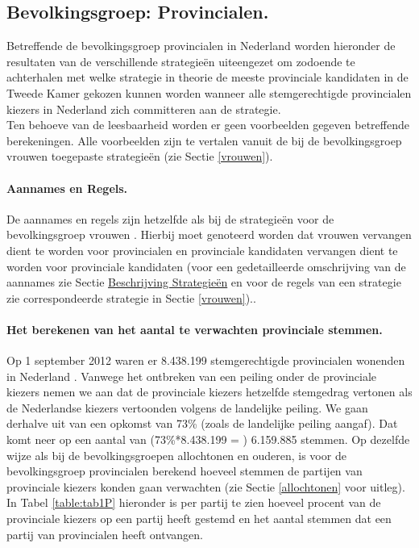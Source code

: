 \subsection{Bevolkingsgroep: Provincialen.} \label{provincialen}
Betreffende de bevolkingsgroep provincialen in Nederland worden hieronder de resultaten van de verschillende strategie\"{e}n uiteengezet om zodoende te achterhalen met welke strategie in theorie de meeste provinciale kandidaten in de Tweede Kamer gekozen kunnen worden wanneer alle stemgerechtigde provincialen kiezers in Nederland zich committeren aan de strategie.\\
\indent Ten behoeve van de leesbaarheid worden er geen voorbeelden gegeven betreffende berekeningen. Alle voorbeelden zijn te vertalen vanuit de bij de bevolkingsgroep vrouwen toegepaste strategie\"{e}n (zie Sectie \ref{vrouwen}). 

\paragraph{Aannames en Regels.}
De aannames en regels zijn hetzelfde als bij de strategie\"{e}n voor de bevolkingsgroep vrouwen . Hierbij moet genoteerd worden dat vrouwen vervangen dient te worden voor provincialen en provinciale kandidaten vervangen dient te worden voor provinciale kandidaten (voor een gedetailleerde omschrijving van de aannames zie Sectie \hyperref[besS]{Beschrijving Strategie\"{e}n} en voor de regels van een strategie zie correspondeerde strategie in Sectie \ref{vrouwen})..

\paragraph{Het berekenen van het aantal te verwachten provinciale stemmen.}

Op 1 september 2012 waren er 8.438.199 stemgerechtigde provincialen wonenden in Nederland \citep{Kiesraad_uitslag}. Vanwege het ontbreken van een peiling onder de provinciale kiezers nemen we aan dat de provinciale kiezers hetzelfde stemgedrag vertonen als de Nederlandse kiezers vertoonden volgens de landelijke peiling. We gaan derhalve uit van een opkomst van 73\% (zoals de landelijke peiling aangaf). Dat komt neer op een aantal van (73\%*8.438.199 = ) 6.159.885 stemmen. Op dezelfde wijze als bij de bevolkingsgroepen allochtonen en ouderen, is voor de bevolkingsgroep provincialen berekend hoeveel stemmen de partijen van provinciale kiezers konden gaan verwachten (zie Sectie \ref{allochtonen} voor uitleg). In Tabel \ref{table:tab1P} hieronder is per partij te zien hoeveel procent van de provinciale kiezers op een partij heeft gestemd en het aantal stemmen dat een partij van provincialen heeft ontvangen.


